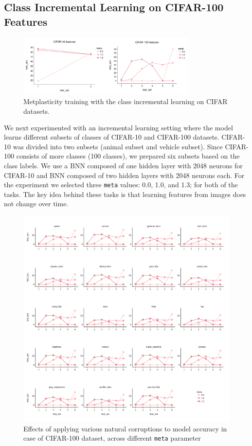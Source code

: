 \documentclass[manuscript,screen,review=false, nonacm]{acmart}
\begin{document}
\subsection{Class Incremental Learning on CIFAR-100 Features}

\begin{figure}[ht]
    \centering
    \includegraphics[width=0.8\textwidth]{figures/report/Fig7.pdf}
    \caption{
    Metplasticity training with the class incremental learning on CIFAR datasets. 
    }
    \label{fig:fig7}
\end{figure}

We next experimented with an incremental learning setting where the model learns different subsets of classes of CIFAR-10 and CIFAR-100 datasets. CIFAR-10 was divided into two subsets (animal subset and vehicle subset). Since CIFAR-100 consists of more classes (100 classes), we prepared six subsets based on the class labels. We use a BNN composed of one hidden layer with 2048 neurons for CIFAR-10 and BNN composed of two hidden layers with 2048 neurons each. For the experiment we selected three \texttt{meta} values: 0.0, 1.0, and 1.3; for both of the tasks. The key idea behind these tasks is that learning features from images does not change over time.


\begin{figure}[ht]
    \centering
    \includegraphics[width=1\textwidth]{figures/report/Fig8.png}
    \caption{Effects of applying various natural corruptions to model accuracy in case of CIFAR-100 dataset, across different \texttt{meta} parameter
    }
    \label{fig:fig8}
\end{figure}
\end{document}
